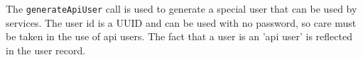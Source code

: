 The \verb+generateApiUser+ call is used to generate a special user that can be used by services. The user id is a UUID and
can be used with no password, so care must be taken in the use of api users. The fact that a user is an 'api user' is reflected
in the user record.
